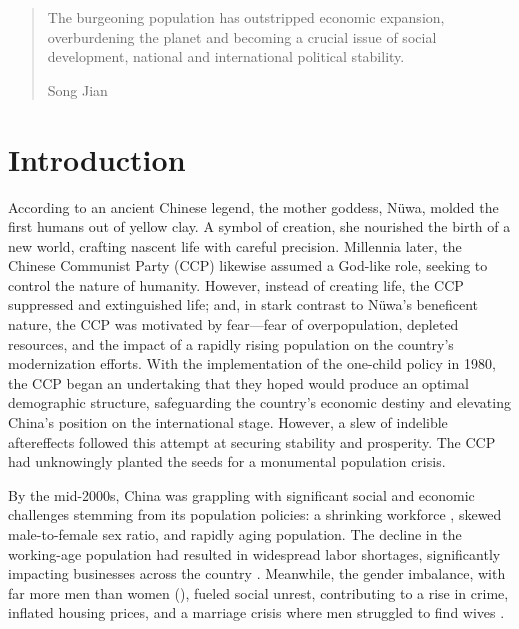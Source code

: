 \documentclass[12pt, a4paper, twoside]{article}
\begin{document}
\maketitle{}

\begin{quote}
The burgeoning population has outstripped economic expansion, overburdening the planet and becoming a crucial issue of social development, national and international political stability.

\hfill Song Jian \autocite[p.\ 11]{SongKongYu1988}
\end{quote}

\section{Introduction}

According to an ancient Chinese legend, the mother goddess, Nüwa, molded the first humans out of yellow clay. A symbol of creation, she nourished the birth of a new world, crafting nascent life with careful precision. Millennia later, the Chinese Communist Party (CCP) likewise assumed a God-like role, seeking to control the nature of humanity. However, instead of creating life, the CCP suppressed and extinguished life; and, in stark contrast to Nüwa's beneficent nature, the CCP was motivated by fear---fear of overpopulation, depleted resources, and the impact of a rapidly rising population on the country's modernization efforts. With the implementation of the one-child policy in 1980, the CCP began an undertaking that they hoped would produce an optimal demographic structure, safeguarding the country's economic destiny and elevating China’s position on the international stage. However, a slew of indelible aftereffects followed this attempt at securing stability and prosperity. The CCP had unknowingly planted the seeds for a monumental population crisis.

By the mid-2000s, China was grappling with significant social and economic challenges stemming from its population policies: a shrinking workforce \autocite[p.\ 356]{White2016PopulationPolicyContext}, skewed male-to-female sex ratio, and rapidly aging population. The decline in the working-age population had resulted in widespread labor shortages, significantly impacting businesses across the country \autocite{SCMP2022WorkerShortages}. Meanwhile, the gender imbalance, with far more men than women (\cites[p.\ 117]{WangEtAl2016AJS}{CameronMengZhang2018}[pp.\ 169--186]{WeiZhangLiu2017}{Hodges2024HousingMarket}), fueled social unrest, contributing to a rise in crime, inflated housing prices, and a marriage crisis where men struggled to find wives \autocite{Fong2016OneChild}.
\end{document}
